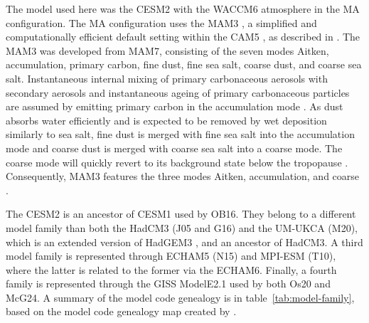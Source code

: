 \documentclass[draft]{agujournal2019}
\begin{document}
  The model used here was the CESM2 with the WACCM6 atmosphere in the MA configuration.
  The MA configuration uses the MAM3 \cite{gettleman2019}, a simplified and
  computationally efficient default setting within the CAM5 \cite{liu2016}, as described
  in . The MAM3 was developed from MAM7, consisting of the seven modes
  Aitken, accumulation, primary carbon, fine dust, fine sea salt, coarse dust, and
  coarse sea salt. Instantaneous internal mixing of primary carbonaceous aerosols with
  secondary aerosols and instantaneous ageing of primary carbonaceous particles are
  assumed by emitting primary carbon in the accumulation mode \cite{liu2016}. As dust
  absorbs water efficiently and is expected to be removed by wet deposition similarly to
  sea salt, fine dust is merged with fine sea salt into the accumulation mode and coarse
  dust is merged with coarse sea salt into a coarse mode. The coarse mode will quickly
  revert to its background state below the tropopause \cite{liu2012}. Consequently, MAM3
  features the three modes Aitken, accumulation, and coarse \cite{liu2016}.

  The CESM2 is an ancestor of CESM1 used by OB16. They belong to a different model
  family than both the HadCM3 (J05 and G16) and the UM-UKCA (M20), which is an extended
  version of HadGEM3 \cite{dhomse2014}, and an ancestor of HadCM3. A third model family
  is represented through ECHAM5 (N15) and MPI-ESM (T10), where the latter is related to
  the former via the ECHAM6. Finally, a fourth family is represented through the GISS
  ModelE2.1 used by both Os20 and McG24. A summary of the model code genealogy is in
  table~\ref{tab:model-family}, based on the model code genealogy map created by
  .
\end{document}
